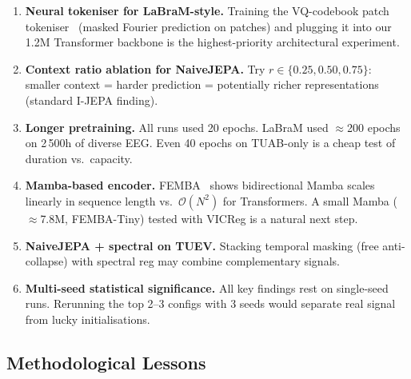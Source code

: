 \documentclass[11pt,a4paper]{article}
\begin{document}
\begin{enumerate}[noitemsep]
  \item \textbf{Neural tokeniser for LaBraM-style.}
    Training the VQ-codebook patch tokeniser~\cite{labram} (masked Fourier prediction on
    patches) and plugging it into our 1.2M Transformer backbone is the highest-priority
    architectural experiment.
  \item \textbf{Context ratio ablation for NaiveJEPA.}
    Try $r \in \{0.25, 0.50, 0.75\}$: smaller context = harder prediction = potentially
    richer representations (standard I-JEPA finding).
  \item \textbf{Longer pretraining.}
    All runs used 20 epochs.  LaBraM used $\approx$200 epochs on 2\,500h of diverse EEG.
    Even 40 epochs on TUAB-only is a cheap test of duration vs.\ capacity.
  \item \textbf{Mamba-based encoder.}
    FEMBA~\cite{femba} shows bidirectional Mamba scales linearly in sequence length vs.\
    $\mathcal{O}(N^2)$ for Transformers.  A small Mamba ($\approx$7.8M, FEMBA-Tiny)
    tested with VICReg is a natural next step.
  \item \textbf{NaiveJEPA + spectral on TUEV.}
    Stacking temporal masking (free anti-collapse) with spectral reg may combine
    complementary signals.
  \item \textbf{Multi-seed statistical significance.}
    All key findings rest on single-seed runs.  Rerunning the top 2--3 configs with 3 seeds
    would separate real signal from lucky initialisations.
\end{enumerate}

\subsection{Methodological Lessons}
\end{document}

